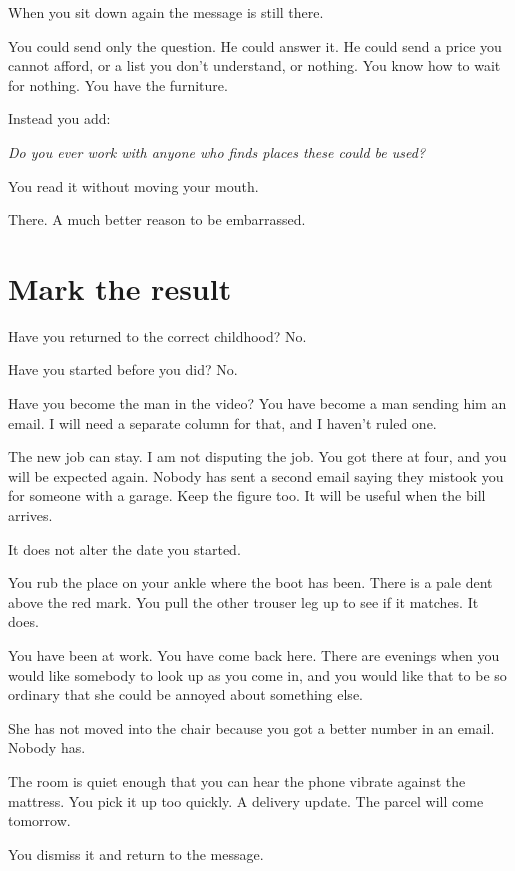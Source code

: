\documentclass[11pt,oneside]{book}
\begin{document}
When you sit down again the message is still there.

You could send only the question. He could answer it. He could send a price you cannot afford, or a list you don't understand, or nothing. You know how to wait for nothing. You have the furniture.

Instead you add:

\emph{Do you ever work with anyone who finds places these could be used?}

You read it without moving your mouth.

There. A much better reason to be embarrassed.

\section*{Mark the result}

Have you returned to the correct childhood? No.

Have you started before you did? No.

Have you become the man in the video? You have become a man sending him an email. I will need a separate column for that, and I haven't ruled one.

The new job can stay. I am not disputing the job. You got there at four, and you will be expected again. Nobody has sent a second email saying they mistook you for someone with a garage. Keep the figure too. It will be useful when the bill arrives.

It does not alter the date you started.

You rub the place on your ankle where the boot has been. There is a pale dent above the red mark. You pull the other trouser leg up to see if it matches. It does.

You have been at work. You have come back here. There are evenings when you would like somebody to look up as you come in, and you would like that to be so ordinary that she could be annoyed about something else.

She has not moved into the chair because you got a better number in an email. Nobody has.

The room is quiet enough that you can hear the phone vibrate against the mattress. You pick it up too quickly. A delivery update. The parcel will come tomorrow.

You dismiss it and return to the message.
\end{document}
